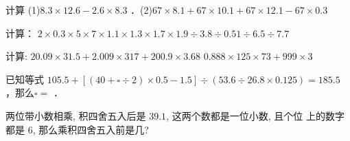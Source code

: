 \begin{zuoye}
	\begin{problems}
		计算  (1)$8.3 \times 12.6-2.6 \times 8.3$ ．\hfil  (2)$ 67 \times 8.1+67 \times 10.1+67 \times 12.1-67 \times 0.3$	
	\end{problems} 
	
	\begin{lxMsol}
		\vspace{\solthreeproblems}
	\end{lxMsol}
\end{zuoye}




\begin{zuoye}
	\begin{problems}
		计算： $2 \times 0.3 \times 5 \times 7 \times 1.1 \times 1.3 \times 1.7 \times 1.9 \div 3.8 \div 0.51 \div 6.5 \div 7.7$
	\end{problems} 
	
	\begin{lxMsol}
		\vspace{\solthreeproblems}
	\end{lxMsol}
\end{zuoye}



\begin{zuoye}
	计算: $20.09 \times 31.5+2.009 \times 317+200.9 \times 3.68$ \hfil $0.888 \times 125 \times 73+999 \times 3$
	
	\begin{lxMsol}
		\vspace{\solfourproblems}
	\end{lxMsol}
\end{zuoye}



\begin{zuoye}
	\begin{problems}
	已知等式 $105.5+[(40+\square \div 2) \times 0.5-1.5] \div(53.6 \div 26.8 \times 0.125)=185.5$ ，那么$\square =$ \tk ．
	\end{problems} 
	
	\begin{lxMsol}
		\vspace{\solthreeproblems}
	\end{lxMsol}
\end{zuoye}

\begin{zuoye}
	两位带小数相乘, 积四舍五入后是 $39.1$, 这两个数都是一位小数, 且个位 上的数字都是 6, 那么乘积四舍五入前是几?	
	
	\begin{lxSsol}
		\vspace{\solfourproblems}
	\end{lxSsol}
\end{zuoye}


